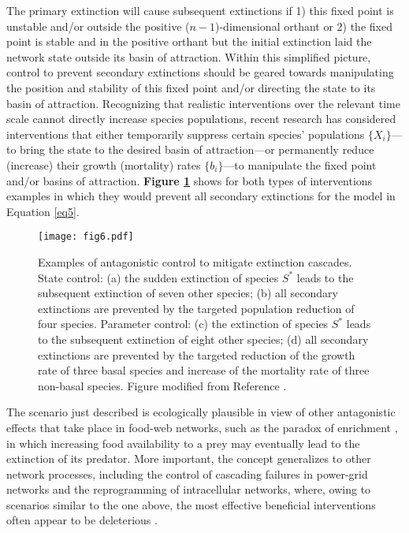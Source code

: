 \documentclass[
preprint,
superscriptaddress,
aps,
prl,
]{revtex4-1}
\begin{document}
The primary extinction will cause subsequent extinctions if 1) this fixed point is unstable and/or outside the positive ($n-1$)-dimensional orthant or 2) the fixed point is stable and in the positive orthant but the initial extinction laid the network state outside its basin of attraction. Within this simplified picture, control to prevent secondary extinctions should 
be geared towards manipulating the position and stability of this fixed point and/or directing the state to its basin of attraction.  Recognizing that realistic interventions over the relevant time scale cannot directly increase species populations, recent research \cite{sahasrabudhe2011rescuing} has 
considered interventions that either temporarily suppress
certain species' populations $\{X_i\}$---to bring the state to the desired basin of attraction---or permanently reduce (increase) their growth (mortality) rates $\{b_i\}$---to manipulate the fixed point and/or basins of attraction.
\textbf{Figure \ref{fig6}} shows for both types of interventions examples in which they would prevent all secondary extinctions for the model in Equation \ref{eq5}.

\begin{figure}[t]
\texttt{[image: fig6.pdf]} 
\caption{Examples of antagonistic control to mitigate extinction cascades.
State control: 
(a) the sudden extinction of species $S^*$ leads to the subsequent extinction of seven other species; 
(b) all secondary extinctions are prevented by the targeted 
population reduction of four species.
Parameter  control:  
(c) the extinction of species $S^*$  leads to the subsequent extinction of eight other species;
(d) all secondary extinctions are prevented by the targeted reduction of the growth rate of three basal species
and increase of the mortality rate of three non-basal species. 
Figure modified
from  Reference \cite{sahasrabudhe2011rescuing}.
}
\label{fig6}
\end{figure}

The scenario just described is ecologically plausible in view of other antagonistic effects that take place in food-web networks, such as the paradox of enrichment \cite{rosenzweig1971paradox}, in which increasing food availability to a prey may eventually lead to the extinction of its predator. More important, the concept generalizes to other network processes, including the control of cascading failures in power-grid networks and the
  {\color{black} reprogramming}
of intracellular networks, where, owing to scenarios similar to the one above,  
the most effective  beneficial interventions often appear to be deleterious  \cite{cornelius2013realistic}.
\end{document}
